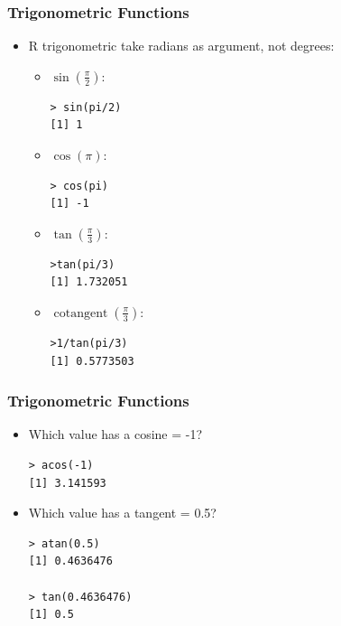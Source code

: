 \documentclass[xcolor=dvipsnames, xcolor=table]{beamer} %
\theoremstyle{mystyle}
\begin{document}
\begin{frame}[fragile]
\frametitle{Trigonometric Functions}
\begin{itemize}
\item R trigonometric take radians as argument, not degrees:

\begin{itemize}
\item $\operatorname{sin}(\frac{\pi}{2})$:
\begin{verbatim}
> sin(pi/2)
[1] 1
\end{verbatim}

\item $\operatorname{cos}(\pi)$:
\begin{verbatim}
> cos(pi)
[1] -1
\end{verbatim}

\item $\operatorname{tan}(\frac{\pi}{3})$:
\begin{verbatim}
>tan(pi/3)
[1] 1.732051
\end{verbatim}

\item $\operatorname{cotangent}(\frac{\pi}{3})$:
\begin{verbatim}
>1/tan(pi/3)
[1] 0.5773503
\end{verbatim}

\end{itemize}

\end{itemize}
\end{frame}


\begin{frame}[fragile]
\frametitle{Trigonometric Functions}

\begin{itemize}
\item Which value has a cosine = -1?

\begin{verbatim}
> acos(-1)
[1] 3.141593

\end{verbatim}

\item Which value has a tangent = 0.5? 

\begin{verbatim}
> atan(0.5)
[1] 0.4636476

> tan(0.4636476)
[1] 0.5
\end{verbatim}

\end{itemize}

\end{frame}
\end{document}
